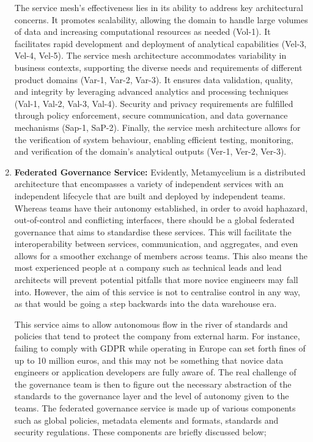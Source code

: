 \documentclass[preprint,12pt]{elsarticle}
\begin{document}
\begin{enumerate}
    The service mesh's effectiveness lies in its ability to address key architectural concerns. It promotes scalability, allowing the domain to handle large volumes of data and increasing computational resources as needed (Vol-1). It facilitates rapid development and deployment of analytical capabilities (Vel-3, Vel-4, Vel-5). The service mesh architecture accommodates variability in business contexts, supporting the diverse needs and requirements of different product domains (Var-1, Var-2, Var-3). It ensures data validation, quality, and integrity by leveraging advanced analytics and processing techniques (Val-1, Val-2, Val-3, Val-4). Security and privacy requirements are fulfilled through policy enforcement, secure communication, and data governance mechanisms (Sap-1, SaP-2). Finally, the service mesh architecture allows for the verification of system behaviour, enabling efficient testing, monitoring, and verification of the domain's analytical outputs (Ver-1, Ver-2, Ver-3).
    
    
    \item  \textbf{Federated Governance Service:} Evidently, Metamycelium is a distributed architecture that encompasses a variety of independent services with an independent lifecycle that are built and deployed by independent teams. Whereas teams have their autonomy established, in order to avoid haphazard, out-of-control and conflicting interfaces, there should be a global federated governance that aims to standardise these services. This will facilitate the interoperability between services, communication, and aggregates, and even allows for a smoother exchange of members across teams. This also means the most experienced people at a company such as technical leads and lead architects will prevent potential pitfalls that more novice engineers may fall into. However, the aim of this service is not to centralise control in any way, as that would be going a step backwards into the data warehouse era. 
    
    This service aims to allow autonomous flow in the river of standards and policies that tend to protect the company from external harm. For instance, failing to comply with GDPR while operating in Europe can set forth fines of up to 10 million euros, and this may not be something that novice data engineers or application developers are fully aware of. The real challenge of the governance team is then to figure out the necessary abstraction of the standards to the governance layer and the level of autonomy given to the teams. The federated governance service is made up of various components such as global policies, metadata elements and formats, standards and security regulations. These components are briefly discussed below;
    

\end{enumerate}
\end{document}
